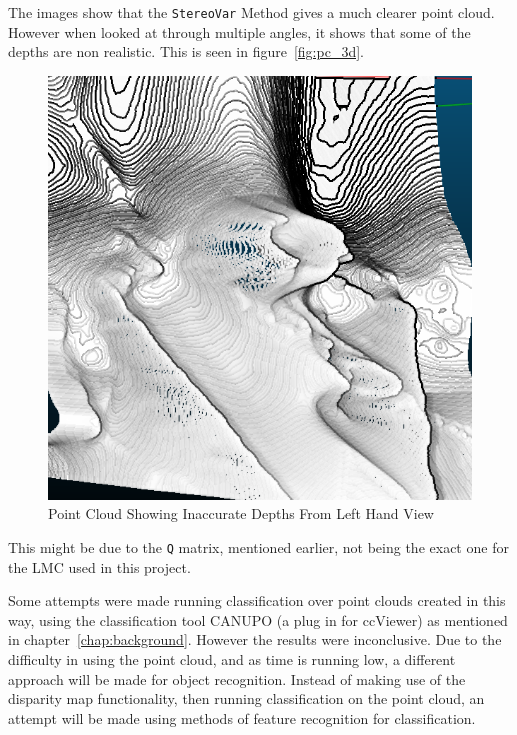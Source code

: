 \documentclass[11pt,oneside]{report}
\newcommand\code[1]{\texttt{#1}}
\begin{document}
			The images show that the \code{StereoVar} Method gives a much clearer point cloud.
			However when looked at through multiple angles, it shows that some of the depths are non realistic.
			This is seen in figure~\ref{fig:pc_3d}.
			\begin{figure}
			\centering
    				\includegraphics[width=\textwidth]{pc_3d_angle}
    			\caption{Point Cloud Showing Inaccurate Depths From Left Hand View \protect {\label{fig:pc_3d}}}

			\end{figure}	
			This might be due to the \code{Q} matrix, mentioned earlier, not being the exact one for the LMC used in this project.
			
			Some attempts were made running classification over point clouds created in this way, using the classification tool CANUPO (a plug in for ccViewer) as mentioned in chapter~\ref{chap:background}.
			However the results were inconclusive.
			Due to the difficulty in using the point cloud, and as time is running low, a different approach will be made for object recognition.
			Instead of making use of the disparity map functionality, then running classification on the point cloud, an attempt will be made using methods of feature recognition for classification.
\end{document}
